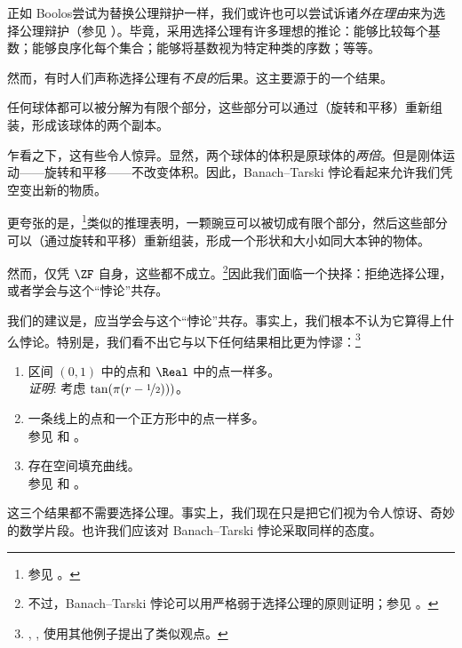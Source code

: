 \documentclass[../../../include/open-logic-section]{subfiles}
\begin{document}

正如 Boolos尝试为替换公理辩护一样，我们或许也可以尝试诉诸\emph{外在理由}来为选择公理辩护（参见 ）。毕竟，采用选择公理有许多理想的推论：能够比较每个基数；能够良序化每个集合；能够将基数视为特定种类的序数；等等。

然而，有时人们声称选择公理有\emph{不良的}后果。这主要源于\cite{BanachTarski1924}的一个结果。

\begin{thm}
任何球体都可以被分解为有限个部分，这些部分可以通过（旋转和平移）重新组装，形成该球体的两个副本。
\end{thm}

\noindent
乍看之下，这有些令人惊异。显然，两个球体的体积是原球体的\emph{两倍}。但是刚体运动——旋转和平移——不改变体积。因此，Banach--Tarski 悖论看起来允许我们凭空变出新的物质。

更夸张的是，\footnote{参见 \citet[Theorem 3.12]{Wagon2016}。}类似的推理表明，一颗豌豆可以被切成有限个部分，然后这些部分可以（通过旋转和平移）重新组装，形成一个形状和大小如同大本钟的物体。

然而，仅凭 $\ZF$ 自身，这些都不成立。\footnote{不过，Banach--Tarski 悖论可以用严格弱于选择公理的原则证明；参见 \citet[303]{Wagon2016}。}因此我们面临一个抉择：拒绝选择公理，或者学会与这个“悖论”共存。

我们的建议是，应当学会与这个“悖论”共存。事实上，我们根本不认为它算得上什么悖论。特别是，我们看不出它与以下任何结果相比更为悖谬：\footnote{\citet[276--7]{Potter2004}, \citet[16]{Weston2003}, \citet[31, 308--9]{Wagon2016} 使用其他例子提出了类似观点。}

\begin{enumerate}
	\item 区间 $(0,1)$ 中的点和 $\Real$ 中的点一样多。
	\\\emph{证明}: 考虑 $\tan(\pi(r-\nicefrac{1}{2})))$。
	\item 一条线上的点和一个正方形中的点一样多。
	\\参见  和 。
	\item 存在空间填充曲线。
	\\参见  和 。
\end{enumerate}

这三个结果都不需要选择公理。事实上，我们现在只是把它们视为令人惊讶、奇妙的数学片段。也许我们应该对 Banach--Tarski 悖论采取同样的态度。
\end{document}
